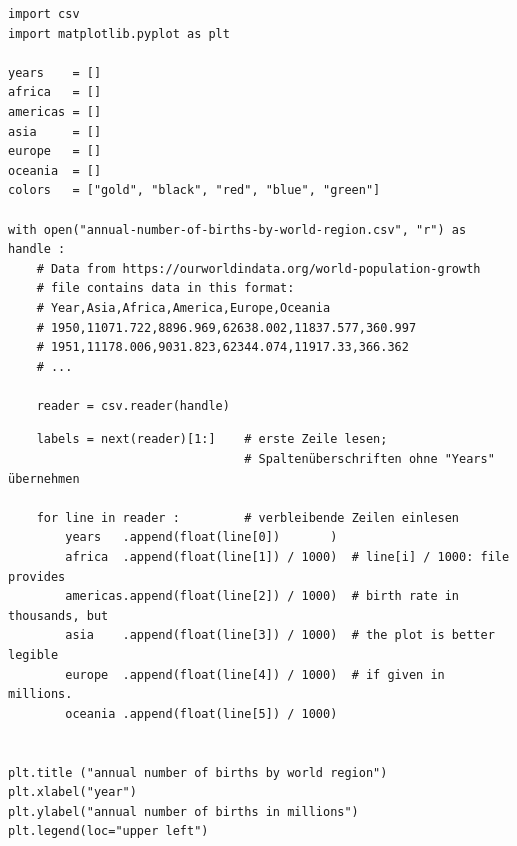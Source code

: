 
\begin{frame}[fragile]
%
\begin{codebox}
\begin{verbatim}
import csv
import matplotlib.pyplot as plt

years    = []
africa   = []
americas = []
asia     = []
europe   = []
oceania  = []
colors   = ["gold", "black", "red", "blue", "green"]

with open("annual-number-of-births-by-world-region.csv", "r") as handle :
    # Data from https://ourworldindata.org/world-population-growth
    # file contains data in this format:
    # Year,Asia,Africa,America,Europe,Oceania
    # 1950,11071.722,8896.969,62638.002,11837.577,360.997
    # 1951,11178.006,9031.823,62344.074,11917.33,366.362
    # ...
      
    reader = csv.reader(handle)
\end{verbatim}
\end{codebox}
%
\end{frame}


\begin{frame}[fragile]
%
\begin{codebox}[... continued ...]
\begin{verbatim}
    labels = next(reader)[1:]    # erste Zeile lesen;
                                 # Spaltenüberschriften ohne "Years" übernehmen

    for line in reader :         # verbleibende Zeilen einlesen
        years   .append(float(line[0])       )
        africa  .append(float(line[1]) / 1000)  # line[i] / 1000: file provides
        americas.append(float(line[2]) / 1000)  # birth rate in thousands, but
        asia    .append(float(line[3]) / 1000)  # the plot is better legible
        europe  .append(float(line[4]) / 1000)  # if given in millions.
        oceania .append(float(line[5]) / 1000)


plt.title ("annual number of births by world region")
plt.xlabel("year")
plt.ylabel("annual number of births in millions")
plt.legend(loc="upper left")
\end{verbatim}
\end{codebox}
%
\end{frame}


